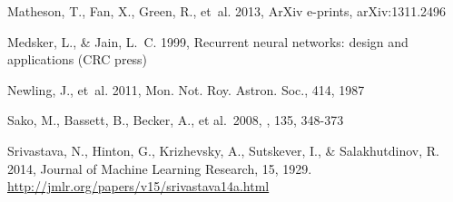 \documentclass[twocolumn]{aastex61}
\begin{document}
\begin{thebibliography}{}
{Matheson}, T., {Fan}, X., {Green}, R., {et~al.} 2013, ArXiv e-prints,
  arXiv:1311.2496
  
Medsker, L., \& Jain, L.~C. 1999, Recurrent neural networks: design and
  applications (CRC press)

Newling, J., {et~al.} 2011, Mon. Not. Roy. Astron. Soc., 414, 1987

 Sako, M., Bassett, B., Becker, A., et al.\ 2008, \aj, 135, 348-373

Srivastava, N., Hinton, G., Krizhevsky, A., Sutskever, I., \& Salakhutdinov, R.
  2014, Journal of Machine Learning Research, 15, 1929.
\newblock \url{http://jmlr.org/papers/v15/srivastava14a.html}

\end{thebibliography}
\end{document}
